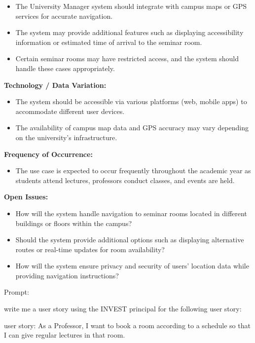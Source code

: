 \documentclass[conference,onecolumn]{IEEEtran}
\begin{document}
\begin{framed}
	\begin{itemize}
		\item The University Manager system should integrate with campus maps or GPS services for accurate navigation.
		\item The system may provide additional features such as displaying accessibility information or estimated time of arrival to the seminar room.
		\item Certain seminar rooms may have restricted access, and the system should handle these cases appropriately.
	\end{itemize}
	
	\textbf{Technology / Data Variation:}
	
	\begin{itemize}
		\item The system should be accessible via various platforms (web, mobile apps) to accommodate different user devices.
		\item The availability of campus map data and GPS accuracy may vary depending on the university's infrastructure.
	\end{itemize}
	
	\textbf{Frequency of Occurrence:}
	
	\begin{itemize}
		\item The use case is expected to occur frequently throughout the academic year as students attend lectures, professors conduct classes, and events are held.
	\end{itemize}
	
	\textbf{Open Issues:}
	
	\begin{itemize}
		\item How will the system handle navigation to seminar rooms located in different buildings or floors within the campus?
		\item Should the system provide additional options such as displaying alternative routes or real-time updates for room availability?
		\item How will the system ensure privacy and security of users' location data while providing navigation instructions?
	\end{itemize}
\end{framed}

Prompt:
\begin{framed}
	\small
	write me a user story using the INVEST principal for the following user story:
	
	user story: As a Professor, I want to book a room according to a schedule so that I can give regular lectures in that room.
\end{framed}
\end{document}
